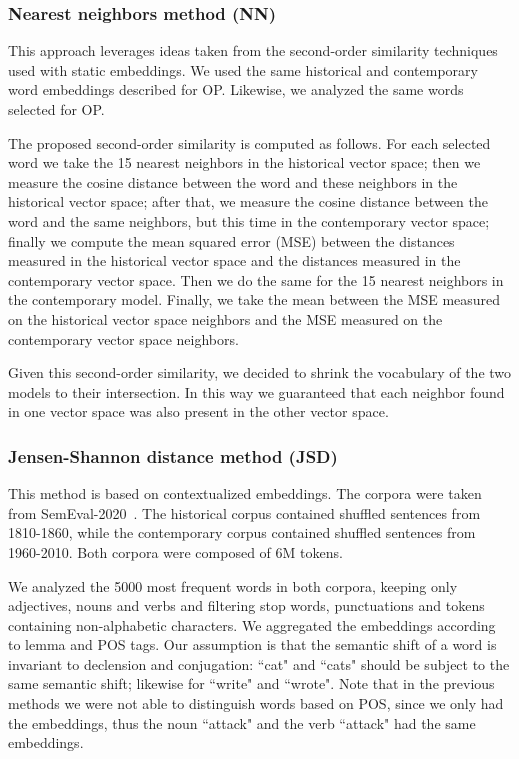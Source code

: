 \documentclass[runningheads]{llncs}
\begin{document}
\subsubsection{Nearest neighbors method (NN)} This approach leverages ideas taken from the second-order similarity techniques used with static embeddings. We used the same historical and contemporary word embeddings described for OP. Likewise, we analyzed the same words selected for OP.

The proposed second-order similarity is computed as follows. For each selected word we take the 15 nearest neighbors in the historical vector space; then we measure the cosine distance between the word and these neighbors in the historical vector space; after that, we measure the cosine distance between the word and the same neighbors, but this time in the contemporary vector space; finally we compute the mean squared error (MSE) between the distances measured in the historical vector space and the distances measured in the contemporary vector space. Then we do the same for the 15 nearest neighbors in the contemporary model. Finally, we take the mean between the MSE measured on the historical vector space neighbors and the MSE measured on the contemporary vector space neighbors. 

Given this second-order similarity, we decided to shrink the vocabulary of the two models to their intersection. In this way we guaranteed that each neighbor found in one vector space was also present in the other vector space. 

\subsubsection{Jensen-Shannon distance method (JSD)} This method is based on contextualized embeddings. The corpora were taken from SemEval-2020~\cite{schlechtweg-etal-2020-semeval}. The historical corpus contained shuffled sentences from 1810-1860, while the contemporary corpus contained shuffled sentences from 1960-2010. Both corpora were composed of 6M tokens.

We analyzed the 5000 most frequent words in both corpora, keeping only adjectives, nouns and verbs and filtering stop words, punctuations and tokens containing non-alphabetic characters. We aggregated the embeddings according to lemma and POS tags. Our assumption is that the semantic shift of a word is invariant to declension and conjugation: “cat" and “cats" should be subject to the same semantic shift; likewise for “write" and “wrote". Note that in the previous methods we were not able to distinguish words based on POS, since we only had the embeddings, thus the noun “attack" and the verb “attack" had the same embeddings.
\end{document}
